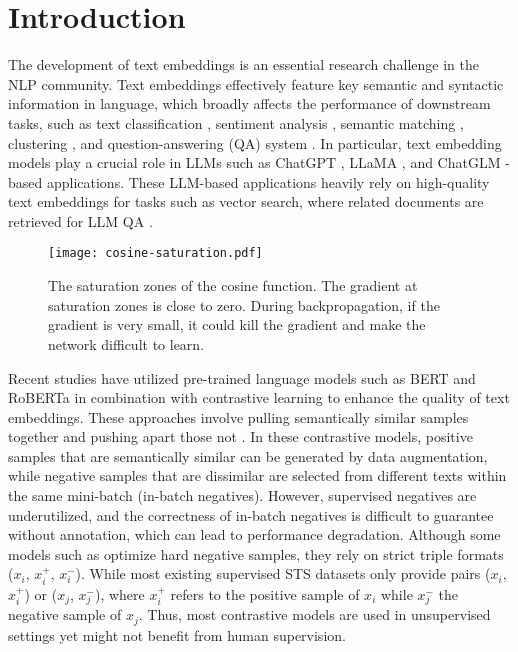 \documentclass{article} \usepackage{iclr2024_conference,times}
\begin{document}
\section{Introduction}
The development of text embeddings \citep{skipthought-ryan-2015,DBLP:conf/naacl/HillCK16,conneau-etal-2017-supervised,cer-etal-2018-universal,sbert-nils-2019,simcse_gao_2021} is an essential research challenge in the NLP community. 
Text embeddings effectively feature key semantic and syntactic information in language, which broadly affects the performance of downstream tasks, such as text classification \citep{li2021merging}, sentiment analysis \citep{suresh-ong-2021-negatives,zhang2022leveraging}, semantic matching \citep{grill2020bootstrap,lu2020deep}, clustering \citep{sbert-nils-2019,contrastive_review_xu_2023}, and question-answering (QA) system \citep{yue-etal-2021-contrastive}. 
In particular, text embedding models play a crucial role in LLMs such as ChatGPT \citep{chatgpt, gpt4}, LLaMA \citep{touvron2023llama, touvron2023llama2}, and ChatGLM \citep{du2022glm}-based applications. These LLM-based applications heavily rely on high-quality text embeddings for tasks such as vector search, where related documents are retrieved for LLM QA \citep{asai-etal-2023-retrieval}. 
\begin{figure}[ht]
    \centering
\texttt{[image: cosine-saturation.pdf]}
    \caption{The saturation zones of the cosine function. The gradient at saturation zones is close to zero. During backpropagation, if the gradient is very small, it could kill the gradient and make the network difficult to learn.}
    \label{cosine-saturation-zone-figure}
\end{figure}

Recent studies \citep{simcse_gao_2021,promcse_jiang_2022,chuang-etal-2022-diffcse,chanchani-huang-2023-composition,zhuo-etal-2023-whitenedcse} have utilized pre-trained language models such as BERT \citep{DevlinCLT19BERT} and RoBERTa \citep{roberta-liu-2019} in combination with contrastive learning to enhance the quality of text embeddings. These approaches involve pulling semantically similar samples together and pushing apart those not \citep{simcse_gao_2021}. 
In these contrastive models, positive samples that are semantically similar can be generated by data augmentation, while negative samples that are dissimilar are selected from different texts within the same mini-batch (in-batch negatives). However, supervised negatives are underutilized, and the correctness of in-batch negatives is difficult to guarantee without annotation, which can lead to performance degradation. Although some models such as \citep{simcse_gao_2021} optimize hard negative samples, they rely on strict triple formats ($x_i$, $x_i^+$, $x_i^-$). While most existing supervised STS datasets only provide pairs ($x_i$, $x_i^+$) or ($x_j$, $x_j^-$), where $x_i^+$ refers to the positive sample of $x_i$ while $x_j^-$ the negative sample of $x_j$.
Thus, most contrastive models are used in unsupervised settings yet might not benefit from human supervision.
\end{document}
